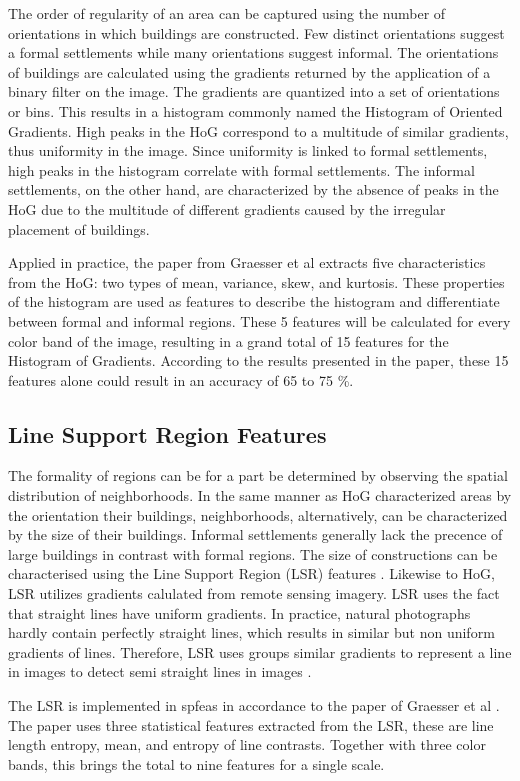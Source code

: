 The order of regularity of an area can be captured using the number of
orientations in which buildings are constructed. Few distinct orientations suggest
a formal settlements while many orientations suggest informal. The orientations
of buildings are calculated using the gradients returned by the application of
a binary filter on the image. The gradients are quantized into a set of
orientations or bins. This results in a histogram commonly named the Histogram
of Oriented Gradients. High peaks in the HoG correspond to a multitude of
similar gradients, thus uniformity in the image. Since uniformity is linked
to formal settlements, high peaks in the histogram correlate with formal
settlements. The informal settlements, on the other hand, are characterized by
the absence of peaks in the HoG due to the multitude of different gradients
caused by the irregular placement of buildings.

Applied in practice, the paper from Graesser et al extracts five
characteristics from the HoG: two types of mean, variance, skew, and
kurtosis. These properties of the histogram are used as features to
describe the histogram and differentiate between formal and informal regions.
These 5 features will be calculated for every color band of the image,
resulting in a grand total of 15 features for the Histogram of Gradients.
According to the results presented in the paper, these 15 features alone could
result in an accuracy of 65 to 75 \%.

\subsection{Line Support Region Features}

The formality of regions can be for a part be determined by observing the
spatial distribution of neighborhoods. In the same manner as HoG characterized
areas by the orientation their buildings, neighborhoods, alternatively, can be
characterized by the size of their buildings. Informal settlements generally
lack the precence of large buildings in contrast with formal regions. The size
of constructions can be characterised using the Line Support Region (LSR)
features \cite{unsalan2004classifying}. Likewise to HoG, LSR utilizes gradients
calulated from remote sensing imagery. LSR uses the fact that straight lines
have uniform gradients. In practice, natural photographs hardly contain
perfectly straight lines, which results in similar but non uniform gradients of
lines. Therefore, LSR uses groups similar gradients to represent a line in
images to detect semi straight lines in images \cite{burns1986extracting}.

The LSR is implemented in spfeas in accordance to the paper of Graesser et al
\cite{graesser2012image}. The paper uses three statistical features extracted
from the LSR, these are line length entropy, mean, and entropy of line
contrasts. Together with three color bands, this brings the total to nine
features for a single scale.
